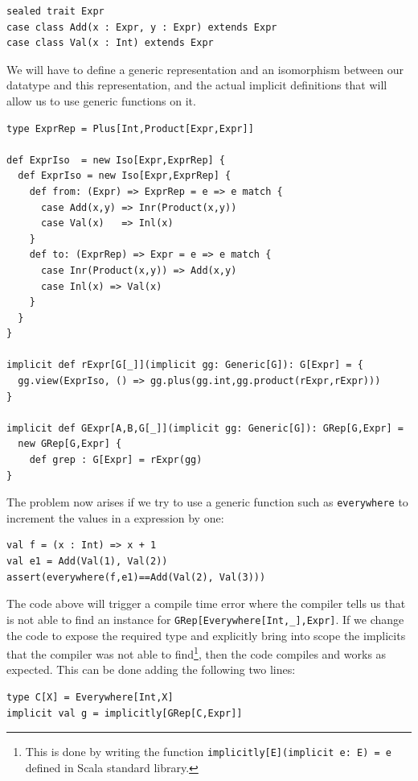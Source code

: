 \documentclass[a4paper]{article}
\begin{document}
\begin{lstlisting}[style=scala, frame=none]
sealed trait Expr
case class Add(x : Expr, y : Expr) extends Expr
case class Val(x : Int) extends Expr
\end{lstlisting}

We will have to define a generic representation and an isomorphism between our datatype and this representation, and the actual implicit definitions that will allow us to use generic functions on it.

\begin{lstlisting}[style=scala, frame=none]
type ExprRep = Plus[Int,Product[Expr,Expr]]

def ExprIso  = new Iso[Expr,ExprRep] {
  def ExprIso = new Iso[Expr,ExprRep] {
    def from: (Expr) => ExprRep = e => e match {
      case Add(x,y) => Inr(Product(x,y))
      case Val(x)   => Inl(x)
    }
    def to: (ExprRep) => Expr = e => e match {
      case Inr(Product(x,y)) => Add(x,y)
      case Inl(x) => Val(x)
    }
  }
} 

implicit def rExpr[G[_]](implicit gg: Generic[G]): G[Expr] = {
  gg.view(ExprIso, () => gg.plus(gg.int,gg.product(rExpr,rExpr)))
}

implicit def GExpr[A,B,G[_]](implicit gg: Generic[G]): GRep[G,Expr] =
  new GRep[G,Expr] {
    def grep : G[Expr] = rExpr(gg)
}
\end{lstlisting}

The problem now arises if we try to use a generic function such as \texttt{everywhere} to 
increment the values in a expression by one:

\begin{lstlisting}[style=scala, frame=none]
val f = (x : Int) => x + 1
val e1 = Add(Val(1), Val(2))
assert(everywhere(f,e1)==Add(Val(2), Val(3)))
\end{lstlisting}

The code above will trigger a compile time error where the compiler tells us that is not able 
to find an instance for \lstinline[basicstyle=\ttfamily\color{white},style=scala]|GRep[Everywhere[Int,_],Expr]|. If we change the code to expose the required type and explicitly bring into scope the implicits that the compiler was not able to find\footnote{This is done by writing the function  \lstinline[basicstyle=\ttfamily\color{white},style=scala]|implicitly[E](implicit e: E) = e| defined in Scala standard library.}, then the code compiles and works as expected. This can be done adding the following two lines:

\begin{lstlisting}[style=scala, frame=none]
type C[X] = Everywhere[Int,X]
implicit val g = implicitly[GRep[C,Expr]]
\end{lstlisting}
\end{document}
